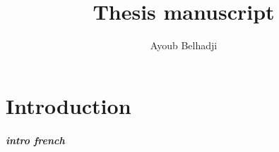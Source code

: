 \documentclass[twoside,11pt]{book}
\numberwithin{theorem}{chapter}
\numberwithin{definition}{chapter}
\numberwithin{proposition}{chapter}
\numberwithin{corollary}{chapter}
\numberwithin{example}{chapter}
\numberwithin{lemma}{chapter}
\numberwithin{assumption}{chapter}
\numberwithin{equation}{chapter}
\numberwithin{figure}{chapter}
\begin{document}
\title{Thesis manuscript}


\maketitleGM
\author{Ayoub Belhadji} %
 






\newpage
\tableofcontents



\chapter{Introduction}\label{chap:introduction}
\paragraph{intro french}
\end{document}
